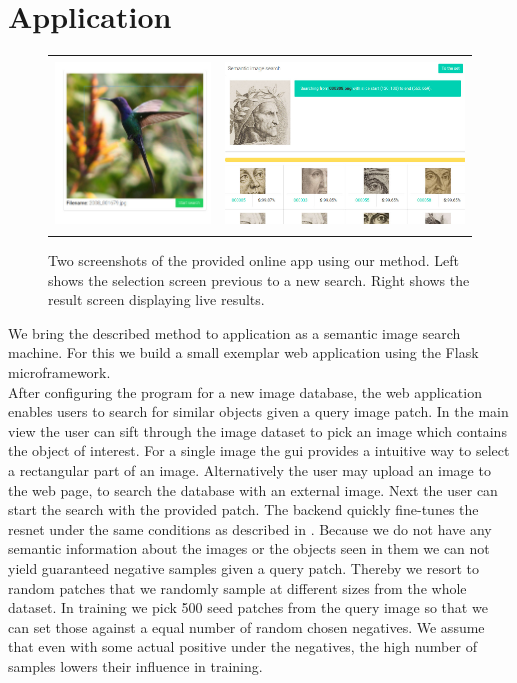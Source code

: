 %
\chapter{Application}
\label{sec:application}
\begin{figure}[h!]
    \begin{tabulary}{\textwidth}{cc}
        \includegraphics[height=4.5cm]{figures/server_select} &
        \includegraphics[height=4.5cm]{figures/server_results}
    \end{tabulary}
    \caption{Two screenshots of the provided online app using our method. Left shows the selection screen previous to a new search. Right shows the result screen displaying live results.}
    \label{fig:application}
\end{figure}
We bring the described method to application as a semantic image search machine. For this we build a small exemplar web application using the Flask microframework.\\
After configuring the program for a new image database, the web application enables users to search for similar objects given a query image patch. In the main view the user can sift through the image dataset to pick an image which contains the object of interest. For a single image the \gls{gui} provides a intuitive way to select a rectangular part of an image. Alternatively the user may upload an image to the web page, to search the database with an external image. Next the user can start the search with the provided patch. The backend quickly fine-tunes the \gls{resnet} under the same conditions as described in . Because we do not have any semantic information about the images or the objects seen in them we can not yield guaranteed negative samples given a query patch. Thereby we resort to random patches that we randomly sample at different sizes from the whole dataset. In training we pick 500 seed patches from the query image so that we can set those against a equal number of random chosen negatives. We assume that even with some actual positive under the negatives, the high number of samples lowers their influence in training.\\
